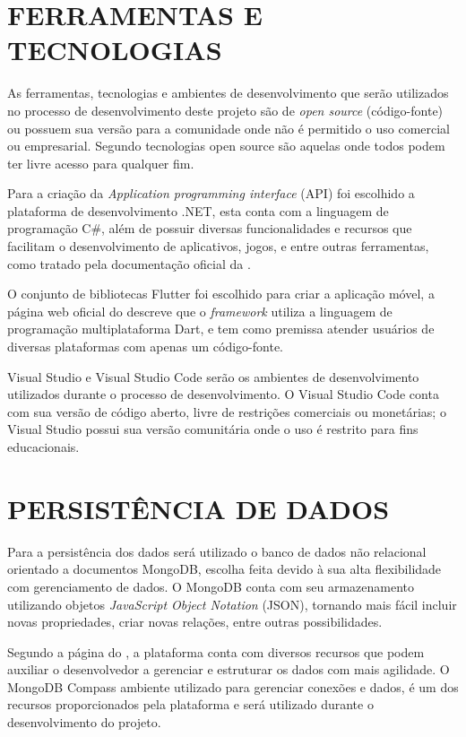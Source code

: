 \section{FERRAMENTAS E TECNOLOGIAS}
\label{sec:feramentasETecnologias}

As ferramentas, tecnologias e ambientes de desenvolvimento que serão utilizados no processo de desenvolvimento deste projeto são de \textit{open source} (código-fonte) ou possuem sua versão para a comunidade onde não é permitido o uso comercial ou empresarial. Segundo  tecnologias open source são aquelas onde todos podem ter livre acesso para qualquer fim.

Para a criação da \textit{Application programming interface} (API) foi escolhido a plataforma de desenvolvimento .NET, esta conta com a linguagem de programação C\#, além de possuir diversas funcionalidades e recursos que facilitam o desenvolvimento de aplicativos, jogos, e entre outras ferramentas, como tratado pela documentação oficial da .

O conjunto de bibliotecas Flutter foi escolhido para criar a aplicação móvel, a página web oficial do  descreve que o \textit{framework} utiliza a linguagem de programação multiplataforma Dart, e tem como premissa atender usuários de diversas plataformas com apenas um código-fonte.

Visual Studio e Visual Studio Code serão os ambientes de desenvolvimento  utilizados durante o processo de desenvolvimento. O Visual Studio Code conta com sua versão de código aberto, livre de restrições comerciais ou monetárias; o Visual Studio possui sua versão comunitária onde o uso é restrito para fins educacionais.

\section{PERSISTÊNCIA DE DADOS}
\label{sec:persistenciaDeDados}

Para a persistência dos dados será utilizado o banco de dados não relacional orientado a documentos MongoDB, escolha feita devido à sua alta flexibilidade com gerenciamento de dados. O MongoDB conta com seu armazenamento utilizando objetos \textit{JavaScript Object Notation} (JSON), tornando mais fácil incluir novas propriedades, criar novas relações, entre outras possibilidades. 

Segundo a página do , a plataforma conta com diversos recursos que podem auxiliar o desenvolvedor a gerenciar e estruturar os dados com mais agilidade. O MongoDB Compass ambiente utilizado para gerenciar conexões e dados, é um dos recursos proporcionados pela plataforma e será utilizado durante o desenvolvimento do projeto.

